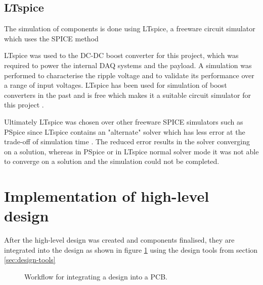 \documentclass[draft]{report}
\newcommand*{\secref}[1]{section \hyperref[{#1}]{\ref*{#1} \nameref*{#1}}}
\begin{document}
\subsection{LTspice}

The simulation of components is done using LTspice, a freeware circuit simulator which uses the SPICE method

LTspice was used to the DC-DC boost converter for this project, which was required to power the internal DAQ systems and the payload. A simulation was performed to characterise the ripple voltage and to validate its performance over a range of input voltages. LTspice has been used for simulation of boost converters in the past and is free which makes it a suitable circuit simulator for this project \cite{giesselmann2019modeling}.

Ultimately LTspice was chosen over other freeware SPICE simulators such as PSpice since LTspice contains an "alternate" solver which has less error at the trade-off of simulation time \cite{ltspice2022}. The reduced error results in the solver converging on a solution, whereas in PSpice or in LTspice normal solver mode it was not able to converge on a solution and the simulation could not be completed.



\section{Implementation of high-level design}

After the high-level design was created and components finalised, they are integrated into the design as shown in figure \ref{fig:implementation-workflow} using the design tools from \secref{sec:design-tools}

\begin{figure}[H]
  \centering
  
  \caption{Workflow for integrating a design into a PCB.}
  \label{fig:implementation-workflow}
\end{figure}
\end{document}

